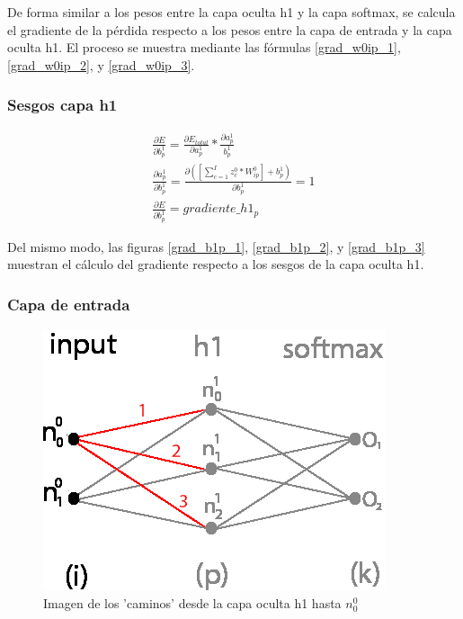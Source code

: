 De forma similar a los pesos entre la capa oculta h1 y la capa softmax, se calcula el gradiente de la pérdida respecto a los pesos entre la capa de entrada y la capa oculta h1. El proceso se muestra mediante las fórmulas \ref{grad_w0ip_1}, \ref{grad_w0ip_2}, y \ref{grad_w0ip_3}.

\subsubsection{Sesgos capa h1}

\begin{gather}
	\frac{\partial E}{\partial b^1_p} = \frac{\partial E_{total} }{\partial a^1_p } * \frac{\partial a^1_p}{b^1_p} \label{grad_b1p_1} \\
	\frac{\partial a^1_p }{\partial b^1_p } = \frac{\partial ([\sum_{c=1}^{I} z^0_c * W^0_{ip}] + b^1_p) }{\partial b^1_p } = 1 \label{grad_b1p_2} \\
	\frac{\partial E}{\partial b^1_p} = gradiente\_h1_p
	\label{grad_b1p_3}
\end{gather}

Del mismo modo, las figuras \ref{grad_b1p_1}, \ref{grad_b1p_2}, y \ref{grad_b1p_3} muestran el cálculo del gradiente respecto a los sesgos de la capa oculta h1.

\subsubsection{Capa de entrada}

\begin{figure}[H]
	\centering
	\includegraphics[scale=0.35]{imagenes/nn_caminos_posibles_input.jpg}  
	\caption{Imagen de los 'caminos' desde la capa oculta h1 hasta $n^0_0$}
	\label{nn_caminos_posibles_input}
\end{figure}

